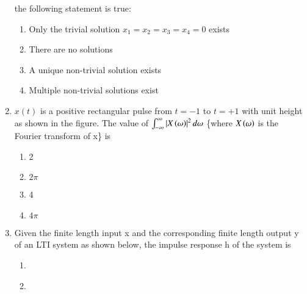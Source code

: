 \documentclass[journal]{IEEEtran}
\begin{document}
\begin{enumerate}
the following statement is true:
 \begin{enumerate}
     \item Only the trivial solution $x_1 = x_2 = x_3 = x_4 = 0$ exists
     \item There are no solutions
     \item A unique non-trivial solution exists
     \item  Multiple non-trivial solutions exist \\
 \end{enumerate}
\item $x(t)$ is a positive rectangular pulse from $t = -1$ to $t = +1$ with unit height as shown in the figure. The value of $\int_{-\infty}^{\infty}\left\vert X\left(\omega\right)\right\vert^2 d\omega$ \{where $X\left(\omega\right)$ is the Fourier transform of x\} is 
\begin{figure}[!ht]
\centering
\resizebox{0.5\textwidth}{!}{%

}%
\end{figure}
\begin{enumerate}
    \item 2
    \item $2\pi$
    \item 4
    \item $4\pi$ \\
\end{enumerate}
\item Given the finite length input x and the corresponding finite length output y of an LTI system as shown below, the impulse response h of the system is 
\begin{figure}[!ht]
\centering
\resizebox{0.5\textwidth}{!}{%

}%
\end{figure}
   \begin{enumerate}
   \item 
   \begin{figure}[!ht]
%
\end{figure}
\item 
   \begin{figure}[!ht]
\end{figure}
\end{enumerate}
\end{enumerate}
\end{document}
